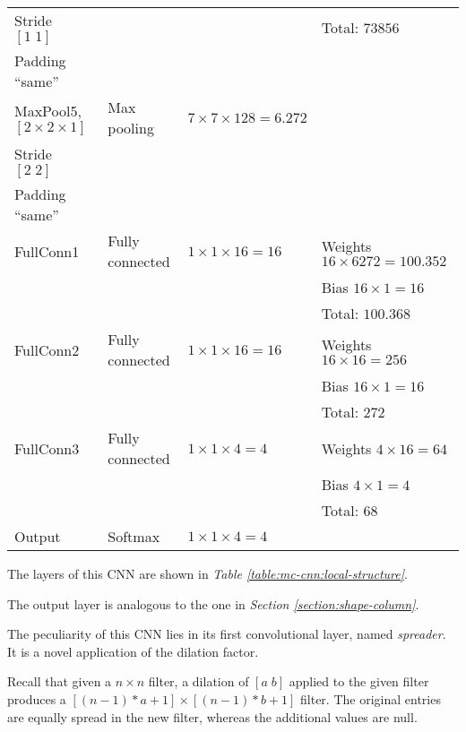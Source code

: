 \begin{table*}
\begin{tabular}{|l|l|l|l|}
                    Stride $\left[1\;1\right]$ & & & Total: $73856$\\
                    Padding ``same'' & & & \\\hline
                    MaxPool5, $\left[2\times 2\times 1\right]$ & Max pooling & $7\times 7\times 128 = 6.272$ & \\
                    Stride $\left[2\;2\right]$ & & & \\
                    Padding ``same'' & & & \\\hline
                    FullConn1 & Fully connected & $1\times 1\times 16 = 16$ & Weights $16\times 6272 = 100.352$\\
                    & & & Bias $16\times 1 = 16$\\
                    & & & Total: $100.368$\\\hline
                    FullConn2 & Fully connected & $1\times 1\times 16 = 16$ & Weights $16\times 16 = 256$\\
                    & & & Bias $16\times 1 = 16$\\
                    & & & Total: $272$\\\hline
                    FullConn3 & Fully connected & $1\times 1\times 4 = 4$ & Weights $4\times 16 = 64$\\
                    & & & Bias $4\times 1 = 4$\\
                    & & & Total: $68$\\\hline
                    Output & Softmax & $1\times 1\times 4 = 4$ & \\
                \hline
            \end{tabular}
            \vspace{0.5cm}
            \caption{Local column CNN layers.}\label{table:mc-cnn:local-structure}
        \end{table*}
        \par{
            The layers of this CNN are shown in \emph{Table \ref{table:mc-cnn:local-structure}}.
        }
        \par{
            The output layer is analogous to the one in \emph{Section \ref{section:shape-column}}.
        }
        \par{
            The peculiarity of this CNN lies in its first convolutional layer, named \emph{spreader}. It is a novel application of the dilation factor. 
        }
        \par{
            Recall that given a $n\times n$ filter, a dilation of $[a\;b]$ applied to the given filter produces a $\left[\left(n-1\right)*a + 1\right] \times \left[\left(n-1\right)*b + 1\right]$ filter. The original entries are equally spread in the new filter, whereas the additional values are null.
        }
